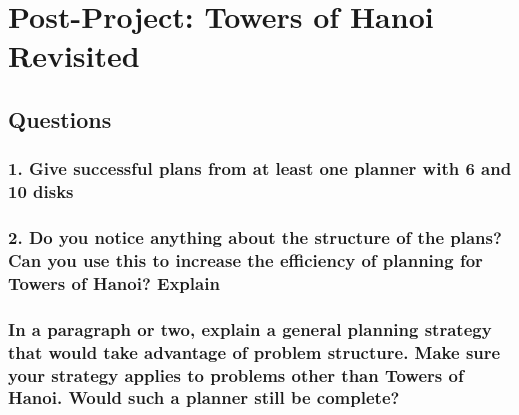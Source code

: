 \documentclass[10pt, letter]{article}
\begin{document}

\section{Post-Project: Towers of Hanoi Revisited}
\subsection{Questions}
\subsubsection*{1. Give successful plans from at least one planner with 6 and 10 disks}
\subsubsection*{2. Do you notice anything about the structure of the plans? Can you use this to increase the
efficiency of planning for Towers of Hanoi? Explain}
\subsubsection*{In a paragraph or two, explain a general planning strategy that would take advantage of
problem structure. Make sure your strategy applies to problems other than Towers of Hanoi.
Would such a planner still be complete?}




\end{document}
